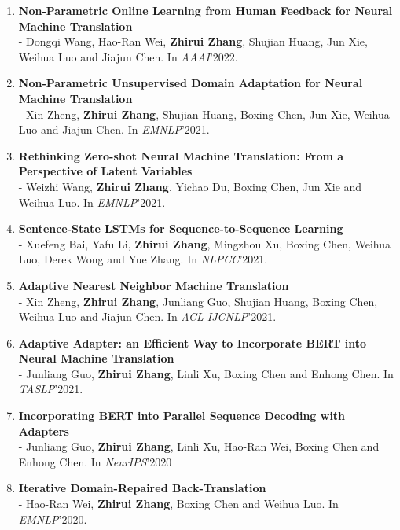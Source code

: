 \documentclass{resume}
\begin{document}
\begin{enumerate}
\item \normalsize \textbf{Non-Parametric Online Learning from Human Feedback for Neural Machine Translation}\\
\small - Dongqi Wang, Hao-Ran Wei, \textbf{Zhirui Zhang}, Shujian Huang, Jun Xie, Weihua Luo and Jiajun Chen. In \textit{AAAI}'2022.

\item \normalsize \textbf{Non-Parametric Unsupervised Domain Adaptation for Neural Machine Translation}\\
\small - Xin Zheng, \textbf{Zhirui Zhang}, Shujian Huang, Boxing Chen, Jun Xie, Weihua Luo and Jiajun Chen. In \textit{EMNLP}'2021.

\item \normalsize \textbf{Rethinking Zero-shot Neural Machine Translation: From a Perspective of Latent Variables}\\
\small - Weizhi Wang, \textbf{Zhirui Zhang}, Yichao Du, Boxing Chen, Jun Xie and Weihua Luo. In \textit{EMNLP}'2021.

\item \normalsize \textbf{Sentence-State LSTMs for Sequence-to-Sequence Learning}\\
\small - Xuefeng Bai, Yafu Li, \textbf{Zhirui Zhang}, Mingzhou Xu, Boxing Chen, Weihua Luo, Derek Wong and Yue Zhang. In \textit{NLPCC}'2021.


\item \normalsize \textbf{Adaptive Nearest Neighbor Machine Translation}\\
\small - Xin Zheng, \textbf{Zhirui Zhang}, Junliang Guo, Shujian Huang, Boxing Chen, Weihua Luo and Jiajun Chen. In \textit{ACL-IJCNLP}'2021.

\item \normalsize \textbf{Adaptive Adapter: an Efficient
Way to Incorporate BERT into Neural Machine Translation}\\
\small - Junliang Guo, \textbf{Zhirui Zhang}, Linli Xu, Boxing Chen and Enhong Chen. In \textit{TASLP}'2021.

\item \normalsize \textbf{Incorporating BERT into Parallel Sequence Decoding with Adapters}\\
\small - Junliang Guo, \textbf{Zhirui Zhang}, Linli Xu, Hao-Ran Wei, Boxing Chen and Enhong Chen. In \textit{NeurIPS}'2020

\item \normalsize \textbf{Iterative Domain-Repaired Back-Translation} \\
\small - Hao-Ran Wei, \textbf{Zhirui Zhang}, Boxing Chen and Weihua Luo. In \textit{EMNLP}'2020.


\end{enumerate}
\end{document}

